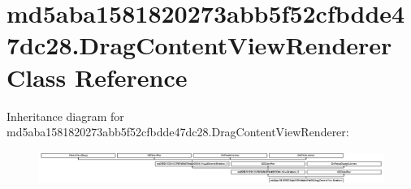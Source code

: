 \hypertarget{classmd5aba1581820273abb5f52cfbdde47dc28_1_1DragContentViewRenderer}{}\section{md5aba1581820273abb5f52cfbdde47dc28.\+Drag\+Content\+View\+Renderer Class Reference}
\label{classmd5aba1581820273abb5f52cfbdde47dc28_1_1DragContentViewRenderer}
Inheritance diagram for md5aba1581820273abb5f52cfbdde47dc28.\+Drag\+Content\+View\+Renderer\+:\begin{figure}[H]
\begin{center}
\leavevmode
\includegraphics[height=1.074341cm]{classmd5aba1581820273abb5f52cfbdde47dc28_1_1DragContentViewRenderer}
\end{center}
\end{figure}
